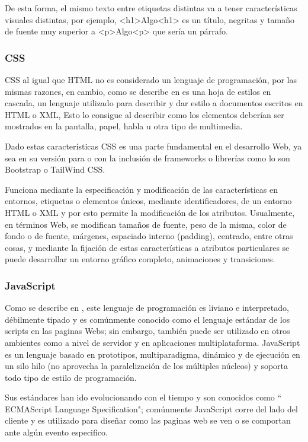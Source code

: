  De esta forma, el mismo texto entre etiquetas distintas va a tener características
 visuales distintas, por ejemplo, <h1>Algo<h1> es un título, negritas y tamaño de
 fuente muy superior a <p>Algo<p> que sería un párrafo.


\subsubsection{CSS}

CSS al igual que HTML no es considerado un lenguaje de programación, por las mismas
razones, en cambio, como se describe en \cite{CSS} es una hoja de estilos en cascada,
un lenguaje utilizado para describir y dar estilo a documentos escritos en HTML o
XML, Esto lo consigue al describir como los elementos deberían ser mostrados en la
pantalla, papel, habla u otra tipo de multimedia.

Dado estas características CSS es una parte fundamental en el desarrollo Web, ya
sea en su versión para o con la inclusión de frameworks o librerías como lo son
Bootstrap o TailWind CSS.

Funciona mediante la especificación y modificación de las características en
entornos, etiquetas o elementos únicos, mediante identificadores, de un entorno
HTML o XML y por esto permite la modificación de los atributos.
Usualmente, en términos Web, se modifican tamaños de fuente, peso de la misma,
color de fondo o de fuente, márgenes, espaciado interno (padding), centrado,
entre otras cosas, y mediante la fijación de estas características a atributos
particulares se puede desarrollar un entorno gráfico completo, animaciones y
transiciones.

\subsubsection{JavaScript}

Como se describe en \cite{JavaScript}, este lenguaje de programación es liviano e
interpretado, débilmente tipado y es comúnmente conocido como el lenguaje estándar
de los scripts en las paginas Webs; sin embargo, también puede ser utilizado en
otros ambientes como a nivel de servidor y en aplicaciones multiplataforma.
JavaScript es un lenguaje basado en prototipos, multiparadigma, dinámico y de
ejecución en un silo hilo (no aprovecha la paralelización de los múltiples
núcleos) y soporta todo tipo de estilo de programación.

Sus estándares han ido evolucionando con el tiempo y son conocidos como
`` ECMAScript Language Specification"; comúnmente JavaScript corre del lado del
cliente y es utilizado para diseñar como las paginas web se ven o se comportan
ante algún evento especifico.

